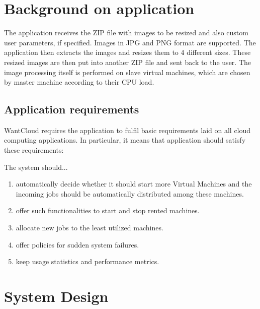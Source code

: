 \section{Background on application}\label{back}
The application receives the ZIP file with images to be resized and also custom user parameters, if specified. Images in JPG and PNG format are supported. The application then extracts the images and resizes them to 4 different sizes. These resized images are then put into another ZIP file and sent back to the user. The image processing itself is performed on slave virtual machines, which are chosen by master machine according to their CPU load.

\subsection{Application requirements}
WantCloud requires the application to fulfil basic requirements laid on all cloud computing applications. In particular, it means that application should satisfy these requirements:

The system should...
\begin{enumerate}
 \item automatically decide whether it should start more Virtual Machines and the incoming jobs should be automatically distributed among these machines.
 \item offer such functionalities to start and stop rented machines.
 \item allocate new jobs to the least utilized machines.
 \item offer policies for sudden system failures.
 \item keep usage statistics and performance metrics.
\end{enumerate}

\section{System Design}\label{sysdesign}
